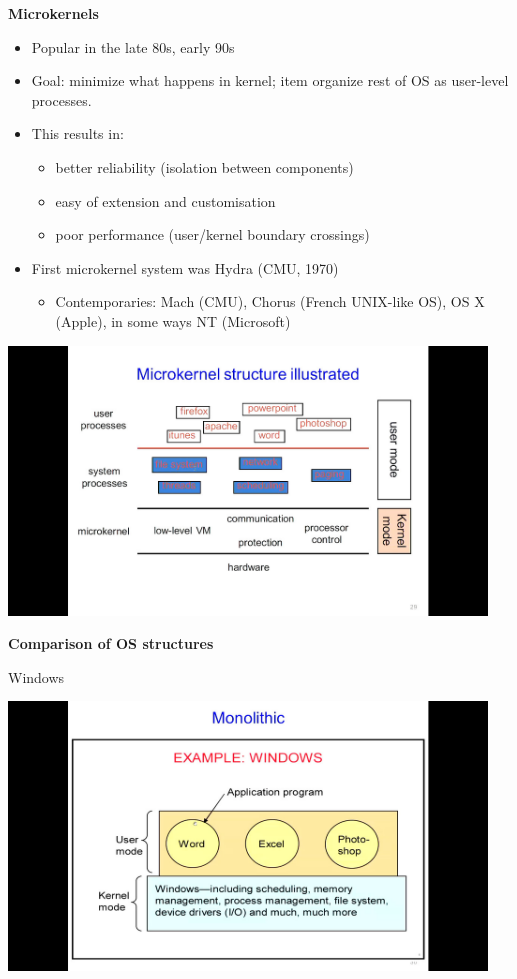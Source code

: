 \documentclass[11pt,a4paper]{article}
\begin{document}
\textbf{Microkernels}
\begin{itemize}
    \item Popular in the late 80s, early 90s
    \item Goal:
        minimize what happens in kernel;
        item organize rest of OS as user-level processes.
    \item This results in:
        \begin{itemize}
            \item better reliability (isolation between components)
            \item easy of extension and customisation
            \item poor performance (user/kernel boundary crossings)
        \end{itemize}
    \item First microkernel system was Hydra (CMU, 1970)
        \begin{itemize}
            \item Contemporaries: Mach (CMU), Chorus (French UNIX-like OS), OS X (Apple),
                in some ways NT (Microsoft)
        \end{itemize}
\end{itemize}

\begin{center}{}
    \includegraphics[height=270]{microkernel-structure-illustrated.jpg}
\end{center}

\textbf{Comparison of OS structures}

Windows

\includegraphics[height=270]{windows.jpg}
\end{document}
